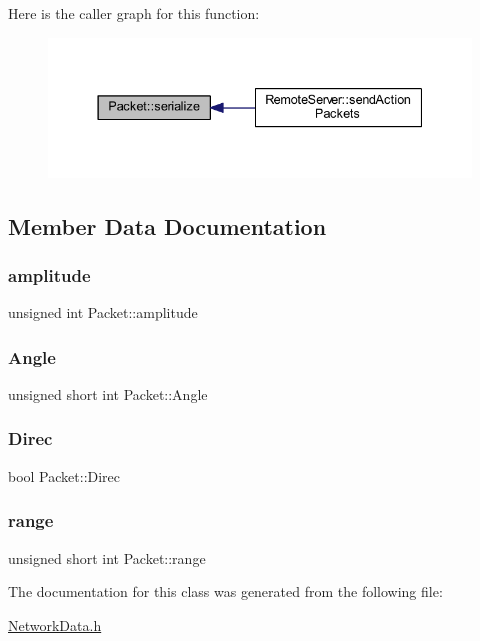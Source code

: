 Here is the caller graph for this function\+:
\nopagebreak
\begin{figure}[H]
\begin{center}
\leavevmode
\includegraphics[width=337pt]{class_packet_a70dba5b27e4b75e68a5b3c36879f62c5_icgraph}
\end{center}
\end{figure}


\subsection{Member Data Documentation}
\mbox{\label{class_packet_a720bab862cb03f6806b055c8a827b98a}} 
\subsubsection{\texorpdfstring{amplitude}{amplitude}}
{\footnotesize\ttfamily unsigned int Packet\+::amplitude}

\mbox{\label{class_packet_ad962f4d6fa0f2b603c1e0b3c6b99542b}} 
\subsubsection{\texorpdfstring{Angle}{Angle}}
{\footnotesize\ttfamily unsigned short int Packet\+::\+Angle}

\mbox{\label{class_packet_a4c52a8445a13d9f17ecec54edc8988ca}} 
\subsubsection{\texorpdfstring{Direc}{Direc}}
{\footnotesize\ttfamily bool Packet\+::\+Direc}

\mbox{\label{class_packet_a86258b3278224f74c1df87ec4e93df7a}} 
\subsubsection{\texorpdfstring{range}{range}}
{\footnotesize\ttfamily unsigned short int Packet\+::range}



The documentation for this class was generated from the following file\+:\begin{DoxyCompactItemize}
\item 
\mbox{\hyperlink{_network_data_8h}{Network\+Data.\+h}}\end{DoxyCompactItemize}
